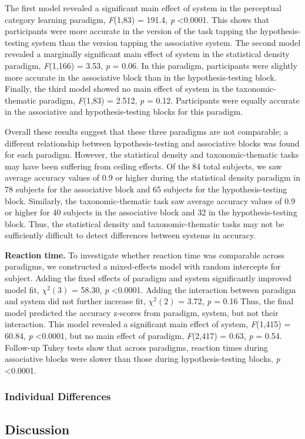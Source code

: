 \documentclass[../dissertation.tex]{subfiles}
\begin{document}
	The first model revealed a significant main effect of system in the perceptual category learning paradigm, \textit{F}(1,83) = 191.4, \textit{p} \textless 0.0001. This shows that participants were more accurate in the version of the task tapping the hypothesis-testing system than the version tapping the associative system. The second model revealed a marginally significant main effect of system in the statistical density paradigm, \textit{F}(1,166) = 3.53, \textit{p} = 0.06. In this paradigm, participants were slightly more accurate in the associative block than in the hypothesis-testing block. Finally, the third model showed no main effect of system in the taxonomic-thematic paradigm, \textit{F}(1,83) = 2.512, \textit{p} = 0.12. Participants were equally accurate in the associative and hypothesis-testing blocks for this paradigm. \par
	Overall these results suggest that these three paradigms are not comparable; a different relationship between hypothesis-testing and associative blocks was found for each paradigm. However, the statistical density and taxonomic-thematic tasks may have been suffering from ceiling effects. Of the 84 total subjects, we saw average accuracy values of 0.9 or higher during the statistical density paradigm in 78 subjects for the associative block and 65 subjects for the hypothesis-testing block. Similarly, the taxonomic-thematic task saw average accuracy values of 0.9 or higher for 40 subjects in the associative block and 32 in the hypothesis-testing block. Thus, the statistical density and taxonomic-thematic tasks may not be sufficiently difficult to detect differences between systems in accuracy. \par
	\textbf{Reaction time.} To investigate whether reaction time was comparable across paradigms, we constructed a mixed-effects model with random intercepts for subject. Adding the fixed effects of paradigm and system significantly improved model fit, $\chi^{2}(3)$ = 58.30, \textit{p} \textless 0.0001. Adding the interaction between paradigm and system did not further increase fit, $\chi^{2}(2)$ = 3.72, \textit{p} = 0.16 Thus, the final model predicted the accuracy z-scores from paradigm, system, but not their interaction. This model revealed a significant main effect of system, \textit{F}(1,415) = 60.84, \textit{p} \textless  0.0001, but no main effect of paradigm, \textit{F}(2,417) = 0.63, \textit{p} = 0.54. Follow-up Tukey tests show that across paradigms, reaction times during associative blocks were slower than those during hypothesis-testing blocks, \textit{p} \textless 0.0001.

\subsubsection{Individual Differences}

\subsection{Discussion}
\end{document}
